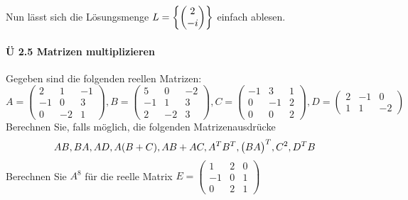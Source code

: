 \documentclass{scrreprt}
\begin{document}
Nun lässt sich die Lösungsmenge
$L = \qty{\begin{pmatrix}2 \\ -i\end{pmatrix}}$
einfach ablesen.

\newpage
\paragraph{Ü 2.5 Matrizen multiplizieren}
Gegeben sind die folgenden reellen Matrizen:
\[
  A =
  \begin{pmatrix}
    2  & 1  & -1 \\
    -1 & 0  & 3  \\
    0  & -2 & 1
  \end{pmatrix},
  B =
  \begin{pmatrix}
    5  & 0  & -2 \\
    -1 & 1  & 3  \\
    2  & -2 & 3
  \end{pmatrix},
  C =
  \begin{pmatrix}
    -1 & 3  & 1 \\
    0  & -1 & 2  \\
    0  & 0  & 2
  \end{pmatrix},
  D =
  \begin{pmatrix}
    2 & -1 & 0  \\
    1 & 1  & -2
  \end{pmatrix}
\]
Berechnen Sie, falls möglich, die folgenden Matrizenausdrücke
\[
  AB, BA, AD, A(B + C), AB + AC, A^TB^T, \qty\big(BA)^T, C^2, D^TB
\]
Berechnen Sie $A^8$ für die reelle Matrix
$E = \begin{pmatrix}
  1  & 2 & 0 \\
  -1 & 0 & 1 \\
  0  & 2 & 1
\end{pmatrix}$
\end{document}

